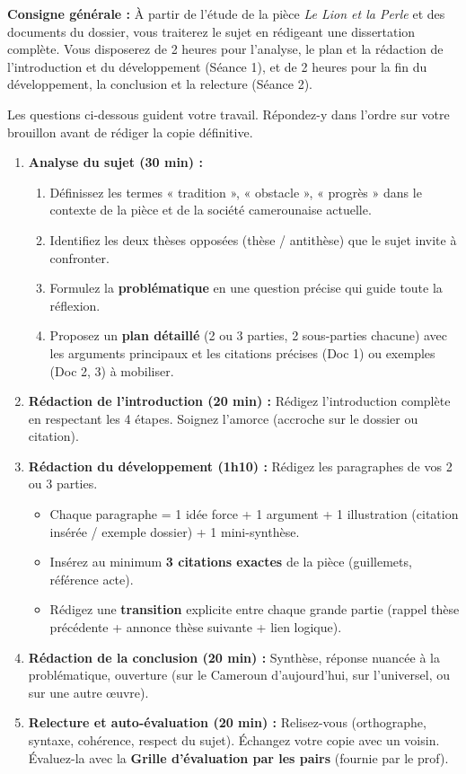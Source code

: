 \documentclass[11pt]{article}
\newcounter{popsec}
\newcounter{popsub}
\newcommand{\courssub}[1]{%
  \stepcounter{popsub}%
  \par\vspace{9pt}\noindent{\popxbold\fontsize{11.5}{13}\selectfont\color{popink}{\color{poporange}\thepopsec.\thepopsub}\hspace{6pt}#1}\par\nopagebreak\vspace{4pt}
}
\begin{document}
\noindent \textbf{Consigne générale :} À partir de l'étude de la pièce \emph{Le Lion et la Perle} et des documents du dossier, vous traiterez le sujet en rédigeant une dissertation complète. Vous disposerez de 2 heures pour l'analyse, le plan et la rédaction de l'introduction et du développement (Séance 1), et de 2 heures pour la fin du développement, la conclusion et la relecture (Séance 2).

\courssub{Consignes}
\noindent Les questions ci-dessous guident votre travail. Répondez-y dans l'ordre sur votre brouillon avant de rédiger la copie définitive.

\begin{enumerate}
    \item \textbf{Analyse du sujet (30 min) :}
    \begin{enumerate}
        \item Définissez les termes « tradition », « obstacle », « progrès » dans le contexte de la pièce et de la société camerounaise actuelle.
        \item Identifiez les deux thèses opposées (thèse / antithèse) que le sujet invite à confronter.
        \item Formulez la \textbf{problématique} en une question précise qui guide toute la réflexion.
        \item Proposez un \textbf{plan détaillé} (2 ou 3 parties, 2 sous-parties chacune) avec les arguments principaux et les citations précises (Doc 1) ou exemples (Doc 2, 3) à mobiliser.
    \end{enumerate}
    \item \textbf{Rédaction de l'introduction (20 min) :} Rédigez l'introduction complète en respectant les 4 étapes. Soignez l'amorce (accroche sur le dossier ou citation).
    \item \textbf{Rédaction du développement (1h10) :} Rédigez les paragraphes de vos 2 ou 3 parties.
    \begin{itemize}
        \item Chaque paragraphe = 1 idée force + 1 argument + 1 illustration (citation insérée / exemple dossier) + 1 mini-synthèse.
        \item Insérez au minimum \textbf{3 citations exactes} de la pièce (guillemets, référence acte).
        \item Rédigez une \textbf{transition} explicite entre chaque grande partie (rappel thèse précédente + annonce thèse suivante + lien logique).
    \end{itemize}
    \item \textbf{Rédaction de la conclusion (20 min) :} Synthèse, réponse nuancée à la problématique, ouverture (sur le Cameroun d'aujourd'hui, sur l'universel, ou sur une autre œuvre).
    \item \textbf{Relecture et auto-évaluation (20 min) :} Relisez-vous (orthographe, syntaxe, cohérence, respect du sujet). Échangez votre copie avec un voisin. Évaluez-la avec la \textbf{Grille d'évaluation par les pairs} (fournie par le prof).
\end{enumerate}
\end{document}
